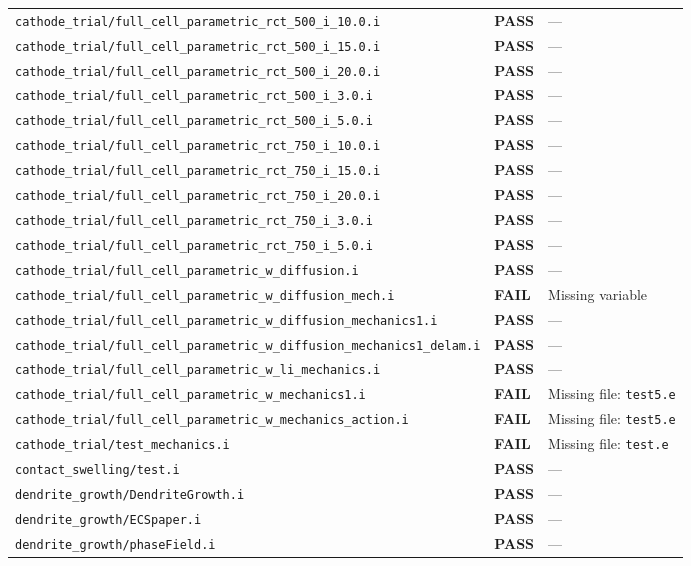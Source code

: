 \documentclass[10pt,letterpaper]{article}
\newcommand{\PASS}{\textcolor{passgreen}{\textbf{PASS}}}
\newcommand{\FAIL}{\textcolor{failred}{\textbf{FAIL}}}
\newcommand{\code}[1]{\texttt{\small #1}}
\begin{document}
\begin{longtable}{p{} l p{}}
\code{cathode\_trial/full\_cell\_parametric\_rct\_500\_i\_10.0.i} & \PASS & --- \\
\code{cathode\_trial/full\_cell\_parametric\_rct\_500\_i\_15.0.i} & \PASS & --- \\
\code{cathode\_trial/full\_cell\_parametric\_rct\_500\_i\_20.0.i} & \PASS & --- \\
\code{cathode\_trial/full\_cell\_parametric\_rct\_500\_i\_3.0.i} & \PASS & --- \\
\code{cathode\_trial/full\_cell\_parametric\_rct\_500\_i\_5.0.i} & \PASS & --- \\
\code{cathode\_trial/full\_cell\_parametric\_rct\_750\_i\_10.0.i} & \PASS & --- \\
\code{cathode\_trial/full\_cell\_parametric\_rct\_750\_i\_15.0.i} & \PASS & --- \\
\code{cathode\_trial/full\_cell\_parametric\_rct\_750\_i\_20.0.i} & \PASS & --- \\
\code{cathode\_trial/full\_cell\_parametric\_rct\_750\_i\_3.0.i} & \PASS & --- \\
\code{cathode\_trial/full\_cell\_parametric\_rct\_750\_i\_5.0.i} & \PASS & --- \\
\code{cathode\_trial/full\_cell\_parametric\_w\_diffusion.i} & \PASS & --- \\
\code{cathode\_trial/full\_cell\_parametric\_w\_diffusion\_mech.i} & \FAIL & Missing variable \\
\code{cathode\_trial/full\_cell\_parametric\_w\_diffusion\_mechanics1.i} & \PASS & --- \\
\code{cathode\_trial/full\_cell\_parametric\_w\_diffusion\_mechanics1\_delam.i} & \PASS & --- \\
\code{cathode\_trial/full\_cell\_parametric\_w\_li\_mechanics.i} & \PASS & --- \\
\code{cathode\_trial/full\_cell\_parametric\_w\_mechanics1.i} & \FAIL & Missing file: \code{test5.e} \\
\code{cathode\_trial/full\_cell\_parametric\_w\_mechanics\_action.i} & \FAIL & Missing file: \code{test5.e} \\
\code{cathode\_trial/test\_mechanics.i} & \FAIL & Missing file: \code{test.e} \\
\code{contact\_swelling/test.i} & \PASS & --- \\
\code{dendrite\_growth/DendriteGrowth.i} & \PASS & --- \\
\code{dendrite\_growth/ECSpaper.i} & \PASS & --- \\
\code{dendrite\_growth/phaseField.i} & \PASS & --- \\

\end{longtable}
\end{document}
